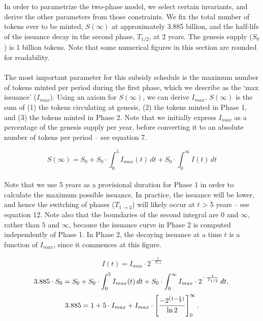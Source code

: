 \documentclass[longbibliography,nofootinbib]{revtex4-1}
\begin{document}
\\\\
 In order to parametrize the two-phase model, we select certain invariants, and derive the other parameters from those constraints. We fix the total number of tokens ever to be minted, $S(\infty)$ at approximately 3.885 billion, and the half-life of the issuance decay in the second phase, $T_{1/2}$, at 2 years. The genesis supply ($S_0$) is 1 billion tokens. Note that some numerical figures in this section are rounded for readability.
\\\\
The most important parameter for this subsidy schedule is the maximum number of tokens minted per period during the first phase, which we describe as the `max issuance' ($I_{max}$). Using an axiom for $S(\infty)$, we can derive $I_{max}$. $S(\infty)$ is the sum of (1) the tokens circulating at genesis, (2) the tokens minted in Phase 1, and (3) the tokens minted in Phase 2. Note that we initially express $I_{max}$ as a percentage of the genesis supply per year, before converting it to an absolute number of tokens per period – see equation 7.

\begin{equation}
    S(\infty) = S_0  +  S_0 \cdot \int_0^{5} I_{max}(t)\, dt  +  S_0 \cdot \int_0^{\infty} I(t)\, dt
\end{equation}
\\
Note that we use 5 years as a provisional duration for Phase 1 in order to calculate the maximum possible issuance. In practice, the issuance will be lower, and hence the switching of phases ($T_{1\rightarrow2}$) will likely occur at $t$ > 5 years – see equation 12. Note also that the boundaries of the second integral are $0$ and $\infty$, rather than $5$ and $\infty$, because the issuance curve in Phase 2 is computed independently of Phase 1. In Phase 2, the decaying issuance at a time $t$ is a function of $I_{max}$, since it commences at this figure.
 
\begin{equation}
    I(t) = I_{max} \cdot 2^{-\frac{t}{T_{1/2}}}
\end{equation}
\begin{equation}
    3.885 \cdot S_0  = S_0 + S_0 \cdot \int_0^{5} I_{max}(t)\, dt + S_0 \cdot \int_0^{\infty} I_{max} \cdot 2^{-\frac{t}{T_{1/2}}} \, dt ,\\
\end{equation}
\begin{equation}
    3.885 = 1 + 5 \cdot  I_{max} + I_{max} \cdot \left[\frac{-2^{(1-\frac{t}{2})}}{\ln{2}}\right]_0^\infty .\\
\end{equation}
\end{document}

